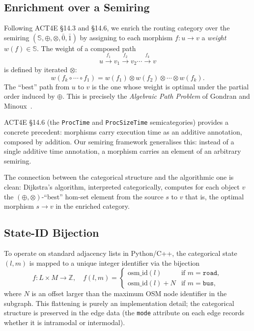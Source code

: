 \documentclass[12pt,a4paper]{article}
\newcommand{\SR}{\mathbb{S}}
\newcommand{\Rzero}{\bar{0}}
\newcommand{\Rone}{\bar{1}}
\newcommand{\opl}{\oplus}
\newcommand{\otm}{\otimes}
\newcommand{\Z}{\mathbb{Z}}
\begin{document}
\subsection{Enrichment over a Semiring}

Following ACT4E §14.3 and §14.6, we enrich the routing category over the
semiring $(\SR, \opl, \otm, \Rzero, \Rone)$ by assigning to each morphism
$f \colon u \to v$ a \emph{weight} $w(f) \in \SR$.  The weight of a
composed path
\[
  u \xrightarrow{f_1} v_1 \xrightarrow{f_2} v_2 \cdots
  \xrightarrow{f_k} v
\]
is defined by iterated $\otm$:
\[
  w(f_k \circ \cdots \circ f_1) = w(f_1) \otm w(f_2) \otm \cdots \otm w(f_k).
\]
The ``best'' path from $u$ to $v$ is the one whose weight is optimal under
the partial order induced by $\opl$.  This is precisely the
\emph{Algebraic Path Problem} of Gondran and Minoux~\cite{gondran2008}.

ACT4E §14.6 (the \texttt{ProcTime} and \texttt{ProcSizeTime}
semicategories) provides a concrete precedent: morphisms carry execution
time as an additive annotation, composed by addition.  Our semiring
framework generalises this: instead of a single additive time annotation, a
morphism carries an element of an arbitrary semiring.

The connection between the categorical structure and the algorithmic one is
clean: Dijkstra's algorithm, interpreted categorically, computes for each
object $v$ the $(\opl, \otm)$-``best'' hom-set element from the source $s$
to $v$  that is, the optimal morphism $s \to v$ in the enriched category.

\subsection{State-ID Bijection}

To operate on standard adjacency lists in Python/C++, the categorical state
$(l, m)$ is mapped to a unique integer identifier via the bijection
\[
  f \colon L \times M \to \Z, \quad
  f(l, m) =
  \begin{cases}
    \mathrm{osm\_id}(l) & \text{if } m = \texttt{road},\\
    \mathrm{osm\_id}(l) + N & \text{if } m = \texttt{bus},
  \end{cases}
\]
where $N$ is an offset larger than the maximum OSM node identifier in the
subgraph.  This flattening is purely an implementation detail; the
categorical structure is preserved in the edge data (the \texttt{mode}
attribute on each edge records whether it is intramodal or intermodal).
\end{document}
